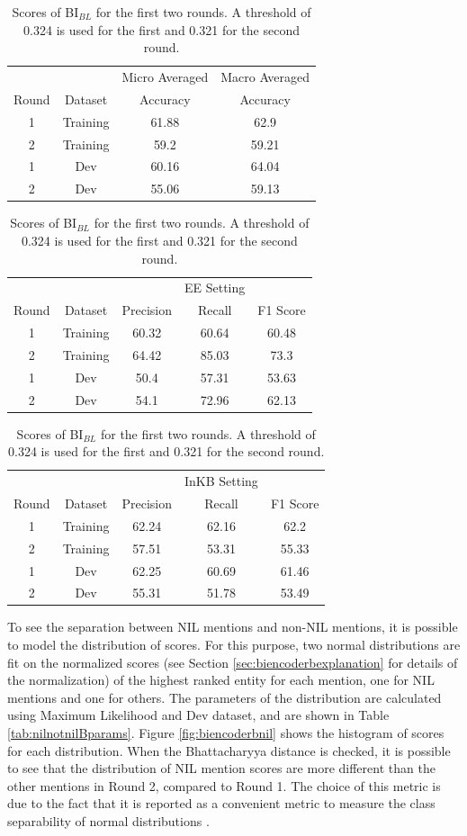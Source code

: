 \documentclass{report}
\theoremstyle{definition}
\theoremstyle{remark}
\begin{document}
\begin{table}
    \centering
    \begin{tabular}{cccc}
    &&Micro Averaged & Macro Averaged\\
    Round    & Dataset & Accuracy &Accuracy \\
    \hline
    1  & Training & 61.88&62.9\\
    2  & Training & 59.2&	59.21\\
    1  & Dev & 60.16	&64.04\\
    2  & Dev & 55.06	&59.13\\
    \end{tabular}
    
    \vspace{0.5cm}\begin{tabular}{ccccc}
    &&&EE Setting & \\
    Round    & Dataset & Precision & Recall & F1 Score \\
    \hline
    1  & Training &60.32&	60.64&	60.48 \\
    2  & Training &64.42&	85.03&	73.3 \\
    1  & Dev &50.4&	57.31&	53.63 \\
    2  & Dev &54.1&	72.96&	62.13\\
    \end{tabular}
    
    \vspace{0.5cm}\begin{tabular}{ccccc}
    &&&InKB Setting & \\
    Round    & Dataset & Precision & Recall & F1 Score \\
    \hline
    1  & Training &62.24&62.16	&62.2\\
    2  & Training &57.51&53.31	&55.33\\
    1  & Dev &62.25&60.69	&61.46 \\
    2  & Dev &55.31&51.78	&53.49\\
    \end{tabular}
    
    \caption{Scores of BI$_{BL}$ for the first two rounds. A threshold of 0.324 is used for the first and 0.321 for the second round.}
    \label{tab:biencoderbres}
\end{table}

To see the separation between NIL mentions and non-NIL mentions, it is possible to model the distribution of scores. For this purpose, two normal distributions are fit on the normalized scores (see Section \ref{sec:biencoderbexplanation} for details of the normalization) of the highest ranked entity for each mention, one for NIL mentions and one for others. The parameters of the distribution are calculated using Maximum Likelihood and Dev dataset, and are shown in Table \ref{tab:nilnotnilBparams}. Figure \ref{fig:biencoderbnil} shows the histogram of scores for each distribution. When the Bhattacharyya distance  \cite{bhatt} is checked, it is possible to see that the distribution of NIL mention scores are more different than the other mentions in Round 2, compared to Round 1. The choice of this metric is due to the fact that it is reported as a convenient metric to measure the class separability of normal distributions \cite{bhatt}.
\end{document}
